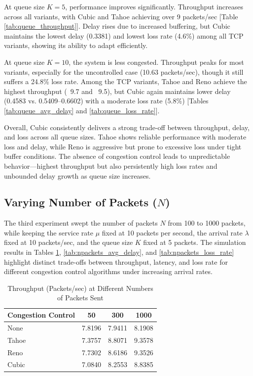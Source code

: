 \documentclass[conference]{IEEEtran}
\begin{document}
At queue size $K=5$, performance improves significantly. 
Throughput increases across all variants, with Cubic and Tahoe achieving over 9 packets/sec [Table \ref{tab:queue_throughput}]. 
Delay rises due to increased buffering, but Cubic maintains the lowest delay (0.3381) and lowest loss rate (4.6\%) among all TCP variants, showing its ability to adapt efficiently.

At queue size $K=10$, the system is less congested. 
Throughput peaks for most variants, especially for the uncontrolled case (10.63 packets/sec), though it still suffers a 24.8\% loss rate. Among the TCP variants, Tahoe and Reno achieve the highest throughput (~9.7 and ~9.5), 
but Cubic again maintains lower delay (0.4583 vs. 0.5409–0.6602) with a moderate loss rate (5.8\%) [Tables \ref{tab:queue_avg_delay} and \ref{tab:queue_loss_rate}].

Overall, Cubic consistently delivers a strong trade-off between throughput, delay, and loss across all queue sizes. 
Tahoe shows reliable performance with moderate loss and delay, while Reno is aggressive but prone to excessive loss under tight buffer conditions. 
The absence of congestion control leads to unpredictable behavior—highest throughput but also persistently high loss rates and unbounded delay growth as queue size increases.

\subsection{Varying Number of Packets ($N$)}
The third experiment swept the number of packets $N$ from 100 to 1000 packets, while keeping the service rate $\mu$ fixed at 10 packets per second,
the arrival rate $\lambda$ fixed at 10 packets/sec, and the queue size $K$ fixed at 5 packets.
The simulation results in Tables \ref{tab:npackets_throughput}, \ref{tab:npackets_avg_delay}, and \ref{tab:npackets_loss_rate} highlight distinct trade-offs between throughput, latency, and loss rate for different congestion control algorithms under increasing arrival rates.

\begin{table}[h!]
    \centering
    \caption{Throughput (Packets/sec) at Different Numbers of Packets Sent}
    \begin{tabular}{lccc}
    \toprule
    \textbf{Congestion Control} & \textbf{50} & \textbf{300} & \textbf{1000} \\
    \midrule
    None  & 7.8196 & 7.9411 & 8.1908 \\
    Tahoe & 7.3757 & 8.8071 & 9.3578 \\
    Reno  & 7.7302 & 8.6186 & 9.3526 \\
    Cubic & 7.0840 & 8.2553 & 8.8385 \\
    \bottomrule
    \end{tabular}
    \label{tab:npackets_throughput}
\end{table}
\end{document}
